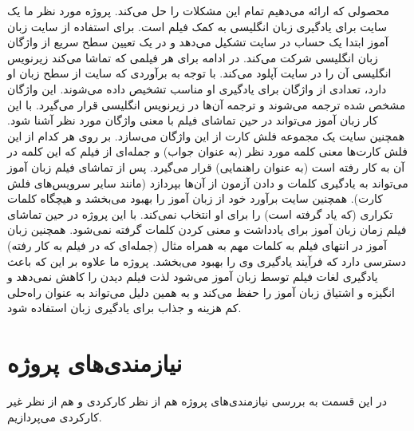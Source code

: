  محصولی که ارائه می‌دهیم تمام این مشکلات را حل می‌کند. پروژه مورد نظر ما یک سایت برای یادگیری زبان انگلیسی به کمک فیلم است. برای استفاده از سایت زبان آموز ابتدا یک حساب در سایت تشکیل می‌دهد و  در یک تعیین سطح سریع از واژگان
 زبان انگلیسی شرکت می‌کند.
 در ادامه برای هر فیلمی که تماشا می‌کند زیرنویس انگلیسی آن را در سایت آپلود می‌کند. با توجه به برآوردی که سایت از سطح زبان او دارد، تعدادی از واژگان برای یادگیری او مناسب تشخیص داده می‌شوند. این واژگان مشخص شده ترجمه می‌شوند و ترجمه آن‌ها در زیرنویس انگلیسی قرار می‌گیرد. با این کار زبان آموز می‌تواند در حین تماشای فیلم با معنی واژگان مورد نظر آشنا شود. همچنین سایت یک مجموعه فلش کارت
 از این واژگان می‌سازد. بر روی هر کدام از این فلش کارت‌ها معنی کلمه مورد نظر (به عنوان جواب) و جمله‌ای از فیلم که این کلمه در آن به کار رفته است (به عنوان راهنمایی) قرار می‌گیرد. پس از تماشای فیلم زبان آموز می‌تواند به یادگیری کلمات و دادن آزمون از آن‌ها بپردازد (مانند سایر سرویس‌های فلش کارت). همچنین سایت برآورد خود از زبان آموز را بهبود می‌بخشد و هیچگاه کلمات تکراری (که یاد گرفته است) را برای او انتخاب نمی‌کند. با این پروژه در حین تماشای فیلم زمان زبان آموز برای یادداشت و معنی کردن کلمات گرفته نمی‌شود. همچنین زبان آموز در انتهای فیلم به کلمات مهم  به همراه مثال (جمله‌ای که در فیلم به کار رفته) دسترسی دارد که فرآیند یادگیری وی را بهبود می‌بخشد. پروژه ما  علاوه بر این که باعث یادگیری لغات فیلم توسط زبان آموز می‌شود لذت فیلم دیدن را کاهش نمی‌دهد و انگیزه و اشتیاق زبان آموز را حفظ می‌کند و به همین دلیل می‌تواند به عنوان راه‌حلی کم هزینه و جذاب  برای یادگیری زبان استفاده شود.
 
 \section{نیازمندی‌های پروژه}
 در این قسمت به بررسی نیازمندی‌های
 پروژه هم از نظر 
 کارکردی
  و هم از نظر غیر کارکردی
   می‌پردازیم.
